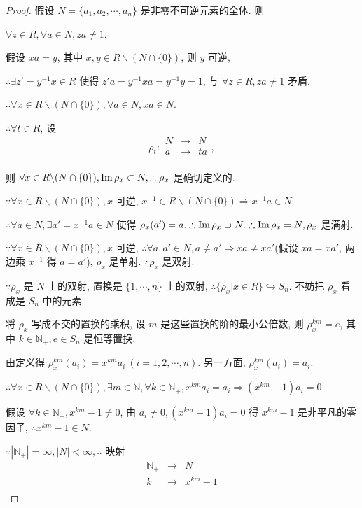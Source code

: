 \documentclass[color=black,device=normal,lang=cn,mode=geye]{elegantnote}
\begin{document}
\begin{proof}
    假设 $N=\{a_1,a_2,\cdots,a_n\}$ 是非零不可逆元素的全体. 则

    $\forall z\in R,\forall a\in N,za\neq 1$.

    假设 $xa=y$, 其中 $x,y\in R\backslash(N\cap\{0\})$, 则 $y$ 可逆,

    $\therefore\exists z'=y^{-1}x\in R$ 使得 $z'a=y^{-1}xa=y^{-1}y=1$, 与 $\forall z\in R,za\neq1$ 矛盾.

    $\therefore\forall x\in R\backslash(N\cap\{0\}),\forall a\in N,xa\in N$.

    $\therefore\forall t\in R$, 设
    \[\rho_t:\begin{array}{rcl}
        N & \to & N \\
        a & \to & ta \\
    \end{array},\]

    则 $\forall x\in R\backslash(N\cap\{0\}),\operatorname{Im} \rho_x\subset N,\therefore\rho_x$ 是确切定义的.

    $\because\forall x\in R\backslash(N\cap\{0\}),x$ 可逆, $x^{-1}\in R\backslash(N\cap\{0\})\Rightarrow x^{-1}a\in N$.

    $\therefore\forall a\in N,\exists a'=x^{-1}a\in N$ 使得 $\rho_x(a')=a.\therefore\operatorname{Im} \rho_x\supset N.\therefore\operatorname{Im} \rho_x=N,\rho_x$ 是满射.

    $\because\forall x\in R\backslash(N\cap\{0\}),x$ 可逆, $\therefore\forall a,a'\in N,a\neq a'\Rightarrow xa\neq xa'$(假设 $xa=xa'$, 两边乘 $x^{-1}$ 得 $a=a'$), $\rho_x$ 是单射. $\therefore\rho_x$ 是双射.

    $\because\rho_x$ 是 $N$ 上的双射, 置换是 $\{1,\cdots,n\}$ 上的双射, $\therefore\{\rho_x|x\in R\}\hookrightarrow S_n$. 不妨把 $\rho_x$ 看成是 $S_n$ 中的元素.

    将 $\rho_x$ 写成不交的置换的乘积, 设 $m$ 是这些置换的阶的最小公倍数, 则 $\rho_x^{km}=e$, 其中 $k\in\mathbb{N}_+,e\in S_n$ 是恒等置换.

    由定义得 $\rho_x^{km}(a_i)=x^{km}a_i\ (i=1,2,\cdots,n)$. 另一方面, $\rho_x^{km}(a_i)=a_i$.

    $\therefore\forall x\in R\backslash(N\cap\{0\}),\exists m\in\mathbb{N},\forall k\in\mathbb{N}_+,x^{km}a_i=a_i\Rightarrow(x^{km}-1)a_i=0$.

    假设 $\forall k\in\mathbb{N}_+,x^{km}-1\neq0$, 由 $a_i\neq0,(x^{km}-1)a_i=0$ 得 $x^{km}-1$ 是非平凡的零因子, $\therefore x^{km}-1\in N$.
    
    $\because|\mathbb{N}_+|=\infty,|N|<\infty,\therefore$ 映射
    \[\begin{array}{rcl}
        \mathbb{N}_+ & \to & N \\
        k & \to & x^{km}-1 \\
    \end{array}\]


\end{proof}
\end{document}
